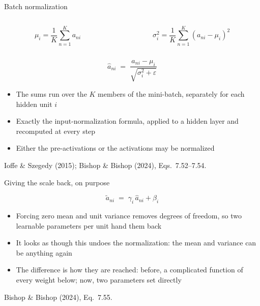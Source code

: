 \documentclass[aspectratio=169, 11pt]{beamer}
\newcommand{\srcline}[1]{%
  \par\vspace{0.25em}%
  {\scriptsize\color{mcMuted}\hfill #1\par}}
\newcommand{\src}[3]{}      %
\begin{document}
\begin{frame}{Batch normalization}
  \src{bishop2024}{equation}{7.52-7.54}
  \src{bishop2024}{section}{7.4.2}
  \src{ioffe2015}{algorithm}{1}
  \src{ioffe2015}{section}{3}
  \vspace{-0.55em}
  \begin{columns}[T, onlytextwidth]
    \begin{column}{0.47\textwidth}
      \[ \mu_i = \frac{1}{K}\sum_{n=1}^{K} a_{ni} \]
    \end{column}
    \begin{column}{0.50\textwidth}
      \[ \sigma_i^2 = \frac{1}{K}\sum_{n=1}^{K}(a_{ni} - \mu_i)^2 \]
    \end{column}
  \end{columns}
  \vspace{-0.6em}
  \[
    \hat{a}_{ni} \;=\; \frac{a_{ni} - \mu_i}{\sqrt{\sigma_i^2 +
      \varepsilon}}
  \]
  \vspace{-0.7em}
  \begin{itemize}\itemsep0.28em
    \item The sums run over the $K$ members of the \alert{mini-batch},
          separately for each hidden unit $i$
    \item Exactly the input-normalization formula, applied to a hidden
          layer and recomputed at every step
    \item Either the pre-activations or the activations may be
          normalized
  \end{itemize}
  \srcline{Ioffe \& Szegedy (2015); Bishop \& Bishop (2024),
  Eqs.~7.52--7.54.}
\end{frame}

\begin{frame}{Giving the scale back, on purpose}
  \src{bishop2024}{equation}{7.55}
  \src{bishop2024}{section}{7.4.2}
  \vspace{-0.35em}
  \[
    \tilde{a}_{ni} \;=\; \gamma_i\, \hat{a}_{ni} + \beta_i
  \]
  \vspace{-0.85em}
  \begin{itemize}\itemsep0.26em
    \item Forcing zero mean and unit variance removes degrees of
          freedom, so two learnable parameters per unit hand them back
    \item It looks as though this undoes the normalization: the mean and
          variance can be anything again
    \item The difference is \alert{how they are reached}: before, a
          complicated function of every weight below; now, two
          parameters set directly
  \end{itemize}
  \srcline{Bishop \& Bishop (2024), Eq.~7.55.}
\end{frame}
\end{document}
